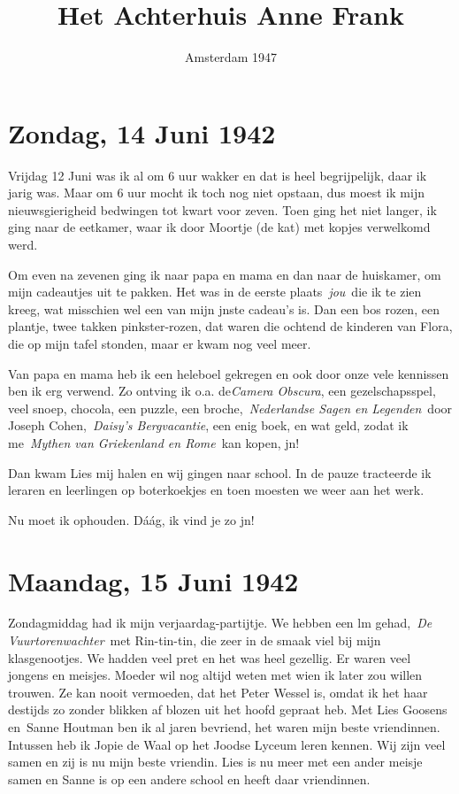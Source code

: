 \documentclass{book}
\title{Het Achterhuis Anne Frank}
\date{Amsterdam 1947}
\begin{document}
\maketitle



\chapter{Zondag, 14 Juni 1942}

Vrijdag 12 Juni was ik al om 6 uur wakker en dat is heel begrijpelijk,
daar ik jarig was. Maar om 6 uur mocht ik toch nog niet opstaan, dus
moest ik mijn nieuwsgierigheid bedwingen tot kwart voor zeven. Toen ging
het niet langer, ik ging naar de eetkamer, waar ik door Moortje (de kat)
met kopjes verwelkomd werd.

Om even na zevenen ging ik naar papa en mama en dan naar de huiskamer,
om mijn cadeautjes uit te pakken. Het was in de eerste
plaats~\emph{jou}~die ik te zien kreeg, wat misschien wel een van mijn
jnste cadeau's is. Dan een bos rozen, een plantje, twee takken
pinkster-rozen, dat waren die ochtend de kinderen van Flora, die op mijn
tafel stonden, maar er kwam nog veel meer.

Van papa en mama heb ik een heleboel gekregen en ook door onze vele
kennissen ben ik erg verwend. Zo ontving ik o.a. de\emph{Camera
Obscura}, een gezelschapsspel, veel snoep, chocola, een puzzle, een
broche,~\emph{Nederlandse Sagen en Legenden}~door Joseph
Cohen,~\emph{Daisy's Bergvacantie}, een enig boek, en wat geld, zodat ik
me~\emph{Mythen van Griekenland en Rome}~kan kopen, jn!

Dan kwam Lies mij halen en wij gingen naar school. In de pauze
tracteerde ik leraren en leerlingen op boterkoekjes en toen moesten we
weer aan het werk.

Nu moet ik ophouden. Dáág, ik vind je zo jn!

\chapter{Maandag, 15 Juni 1942}

Zondagmiddag had ik mijn verjaardag-partijtje. We hebben een lm
gehad,~\emph{De Vuurtorenwachter}~met Rin-tin-tin, die zeer in de smaak
viel bij mijn klasgenootjes. We hadden veel pret en het was heel
gezellig. Er waren veel jongens en meisjes. Moeder wil nog altijd weten
met wien ik later zou willen trouwen. Ze kan nooit vermoeden, dat het
Peter Wessel is, omdat ik het haar destijds zo zonder blikken af blozen
uit het hoofd gepraat heb. Met Lies Goosens en~Sanne Houtman ben ik al
jaren bevriend, het waren mijn beste vriendinnen. Intussen heb ik Jopie
de Waal op het Joodse Lyceum leren kennen. Wij zijn veel samen en zij is
nu mijn beste vriendin. Lies is nu meer met een ander meisje samen en
Sanne is op een andere school en heeft daar vriendinnen.
\end{document}
